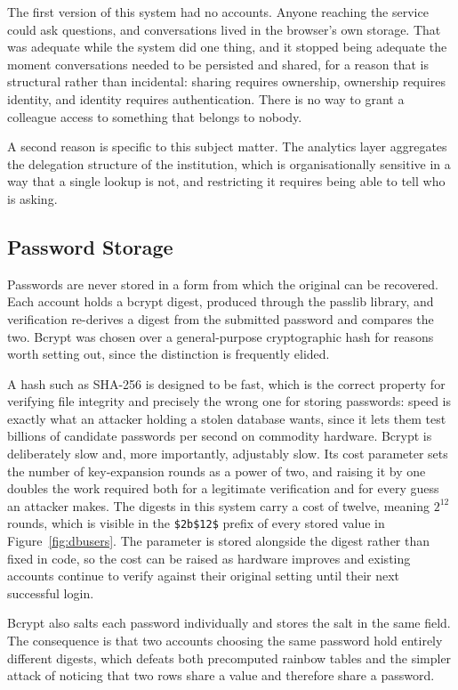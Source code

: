 The first version of this system had no accounts. Anyone reaching the service could ask
questions, and conversations lived in the browser's own storage. That was adequate while the
system did one thing, and it stopped being adequate the moment conversations needed to be
persisted and shared, for a reason that is structural rather than incidental: sharing
requires ownership, ownership requires identity, and identity requires authentication. There
is no way to grant a colleague access to something that belongs to nobody.

A second reason is specific to this subject matter. The analytics layer aggregates the
delegation structure of the institution, which is organisationally sensitive in a way that a
single lookup is not, and restricting it requires being able to tell who is asking.

\subsection{Password Storage}

Passwords are never stored in a form from which the original can be recovered. Each account
holds a bcrypt digest, produced through the passlib library, and verification re-derives a
digest from the submitted password and compares the two. Bcrypt was chosen over a
general-purpose cryptographic hash for reasons worth setting out, since the distinction is
frequently elided.

A hash such as SHA-256 is designed to be fast, which is the correct property for verifying
file integrity and precisely the wrong one for storing passwords: speed is exactly what an
attacker holding a stolen database wants, since it lets them test billions of candidate
passwords per second on commodity hardware. Bcrypt is deliberately slow and, more
importantly, adjustably slow. Its cost parameter sets the number of key-expansion rounds as a
power of two, and raising it by one doubles the work required both for a legitimate
verification and for every guess an attacker makes. The digests in this system carry a cost
of twelve, meaning $2^{12}$ rounds, which is visible in the \texttt{\$2b\$12\$} prefix of
every stored value in Figure~\ref{fig:dbusers}. The parameter is stored alongside the digest
rather than fixed in code, so the cost can be raised as hardware improves and existing
accounts continue to verify against their original setting until their next successful login.

Bcrypt also salts each password individually and stores the salt in the same field. The
consequence is that two accounts choosing the same password hold entirely different digests,
which defeats both precomputed rainbow tables and the simpler attack of noticing that two
rows share a value and therefore share a password.


